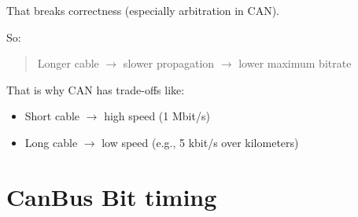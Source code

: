 \begin{itemize}
That breaks correctness (especially arbitration in CAN).

So:
\begin{quote}
Longer cable $\rightarrow$ slower propagation $\rightarrow$ lower maximum bitrate
\end{quote}

That is why CAN has trade-offs like:
\begin{itemize}
    \item Short cable $\rightarrow$ high speed (1 Mbit/s)
    \item Long cable $\rightarrow$ low speed (e.g., 5 kbit/s over kilometers)
\end{itemize}

\end{itemize}

\section{CanBus Bit timing}

